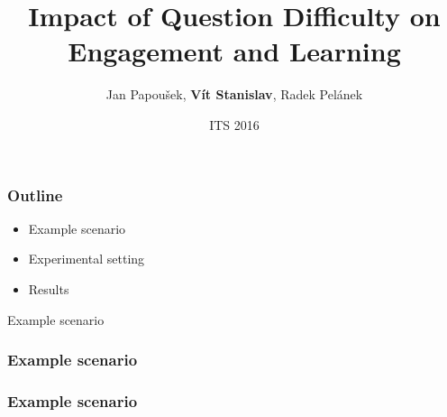\documentclass[bigger]{beamer}
\title{Impact of Question Difficulty on Engagement and Learning}
\author{Jan Papou\v{s}ek, \textbf{V\'it Stanislav}, Radek Pel\'anek \\
}
\date{ITS 2016}
\begin{document}
\frame{\titlepage}

\begin{frame}
  \frametitle{Outline}
	\begin{itemize}
	  \item Example scenario
	  \item Experimental setting
	  \item Results
	\end{itemize}
\end{frame}

\begin{frame}
	\begin{center}
    {\Huge Example scenario} 
	\end{center}
\end{frame}

\begin{frame}
  \frametitle{Example scenario}
	\noindent{}
\end{frame}

\begin{frame}
  \frametitle{Example scenario}
	\noindent{}
\end{frame}
\end{document}

